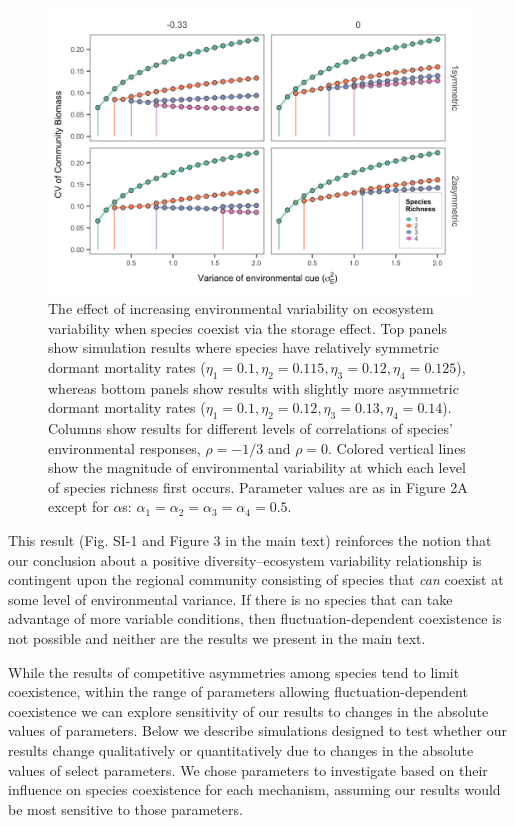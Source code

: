 \documentclass[11pt,]{article}
\begin{document}
\begin{figure}[!ht]
  \centering
      \includegraphics[width=6in]{./components/SI_storage_effect_asymmetric_etas.png}
  \caption{The effect of increasing environmental variability on ecosystem variability when species coexist via the storage effect. Top panels show simulation results where species have relatively symmetric dormant mortality rates ($\eta_1=0.1, \eta_2=0.115, \eta_3=0.12, \eta_4=0.125$), whereas bottom panels show results with slightly more asymmetric dormant mortality rates ($\eta_1=0.1, \eta_2=0.12, \eta_3=0.13, \eta_4=0.14$). Columns show results for different levels of correlations of species' environmental responses, $\rho = -1/3$ and $\rho = 0$. Colored vertical lines show the magnitude of environmental variability at which each level of species richness first occurs. Parameter values are as in Figure 2A except for $\alpha$s: $\alpha_1 = \alpha_2 = \alpha_3 = \alpha_4 = 0.5$.}
\end{figure}

This result (Fig. SI-1 and Figure 3 in the main text) reinforces the
notion that our conclusion about a positive diversity--ecosystem
variability relationship is contingent upon the regional community
consisting of species that \emph{can} coexist at some level of
environmental variance. If there is no species that can take advantage
of more variable conditions, then fluctuation-dependent coexistence is
not possible and neither are the results we present in the main text.

While the results of competitive asymmetries among species tend to limit
coexistence, within the range of parameters allowing
fluctuation-dependent coexistence we can explore sensitivity of our
results to changes in the absolute values of parameters. Below we
describe simulations designed to test whether our results change
qualitatively or quantitatively due to changes in the absolute values of
select parameters. We chose parameters to investigate based on their
influence on species coexistence for each mechanism, assuming our
results would be most sensitive to those parameters.
\end{document}
